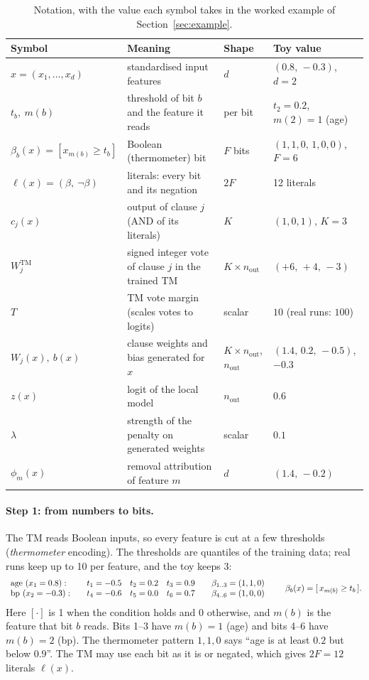 \begin{table}[h!]
  \centering\small\setlength{\tabcolsep}{4pt}
  \caption{Notation, with the value each symbol takes in the worked example of Section~\ref{sec:example}.}
  \label{tab:notation}
  \begin{tabular}{@{}l l l l@{}}
    \toprule
    Symbol & Meaning & Shape & Toy value\\
    \midrule
    $x=(x_1,\dots,x_d)$ & standardised input features & $d$ & $(0.8,\,-0.3)$, $d=2$\\
    $t_b,\ m(b)$ & threshold of bit $b$ and the feature it reads & per bit & $t_2=0.2$, $m(2)=1$ (age)\\
    $\beta_b(x)=[x_{m(b)}\ge t_b]$ & Boolean (thermometer) bit & $F$ bits & $(1,1,0,\,1,0,0)$, $F=6$\\
    $\ell(x)=(\beta,\ \lnot\beta)$ & literals: every bit and its negation & $2F$ & 12 literals\\
    $c_j(x)$ & output of clause $j$ (AND of its literals) & $K$ & $(1,0,1)$, $K=3$\\
    $W^\text{TM}_{j}$ & signed integer vote of clause $j$ in the trained TM & $K\times n_\text{out}$ & $(+6,\,+4,\,-3)$\\
    $T$ & TM vote margin (scales votes to logits) & scalar & $10$ (real runs: $100$)\\
    $W_{j}(x),\ b(x)$ & clause weights and bias generated for $x$ & $K\times n_\text{out}$, $n_\text{out}$ & $(1.4,\,0.2,\,-0.5)$, $-0.3$\\
    $z(x)$ & logit of the local model & $n_\text{out}$ & $0.6$\\
    $\lambda$ & strength of the penalty on generated weights & scalar & $0.1$\\
    $\phi_m(x)$ & removal attribution of feature $m$ & $d$ & $(1.4,\,-0.2)$\\
    \bottomrule
  \end{tabular}
\end{table}

\paragraph{Step 1: from numbers to bits.} The TM reads Boolean inputs, so every feature is cut at a few
thresholds (\emph{thermometer} encoding). The thresholds are quantiles of the training data; real runs
keep up to 10 per feature, and the toy keeps 3:
\[
\begin{array}{l@{\qquad}ccc@{\qquad}l}
  \text{age } (x_1=0.8): & t_1=-0.5 & t_2=0.2 & t_3=0.9 & \beta_{1..3}=(1,1,0)\\
  \text{bp } (x_2=-0.3): & t_4=-0.6 & t_5=0.0 & t_6=0.7 & \beta_{4..6}=(1,0,0)
\end{array}
\qquad \beta_b(x)=[\,x_{m(b)}\ge t_b\,].
\]
Here $[\cdot]$ is 1 when the condition holds and 0 otherwise, and $m(b)$ is the feature that bit $b$
reads. Bits 1--3 have $m(b)=1$ (age) and bits 4--6 have $m(b)=2$ (bp). The thermometer pattern
$1,1,0$ says ``age is at least $0.2$ but below $0.9$''. The TM may use each bit as it is or negated,
which gives $2F=12$ literals $\ell(x)$.


